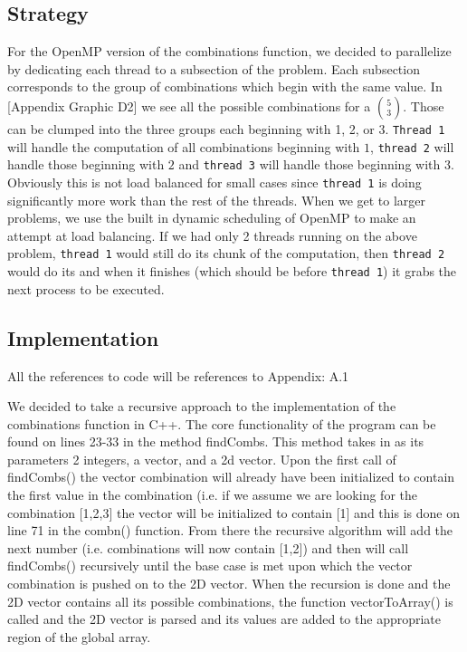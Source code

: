 \documentclass[titlepage, 11pt]{article}
\begin{document}
\subsection{Strategy}
For the OpenMP version of the combinations function, we decided to parallelize by dedicating each thread to a subsection of the problem. Each subsection corresponds to the group of combinations which begin with the same value. In [Appendix Graphic D2] we see all the possible combinations for a ${5 \choose 3}$. Those can be clumped into the three groups each beginning with 1, 2, or 3. \verb;Thread 1; will handle the computation of all combinations beginning with $1$, \verb;thread 2; will handle those beginning with $2$ and \verb;thread 3; will handle those beginning with $3$. Obviously this is not load balanced for small cases since \verb;thread 1; is doing significantly more work than the rest of the threads. When we get to larger problems, we use the built in dynamic scheduling of OpenMP to make an attempt at load balancing. If we had only 2 threads running on the above problem, \verb;thread 1; would still do its chunk of the computation, then \verb;thread 2; would do its and when it finishes (which should be before \verb;thread 1;) it grabs the next process to be executed.



\subsection{Implementation}

\begin{center}\textcolor{black!50}{All the references to code will be references to Appendix: A.1}\\ \end{center}
We decided to take a recursive approach to the implementation of the combinations function in C++. The core functionality of the program can be found on lines 23-33 in the method findCombs. This method takes in as its parameters 2 integers, a vector, and a 2d vector. Upon the first call of findCombs() the vector combination will already have been initialized to contain the first value in the combination (i.e. if we assume we are looking for the combination [1,2,3] the vector will be initialized to contain [1] and this is done on line 71 in the combn() function. From there the recursive algorithm will add the next number (i.e. combinations will now contain [1,2]) and then will call findCombs() recursively until the base case is met upon which the vector combination is pushed on to the 2D vector. When the recursion is done and the 2D vector contains all its possible combinations, the function vectorToArray() is called and the 2D vector is parsed and its values are added to the appropriate region of the global array. 
\end{document}
